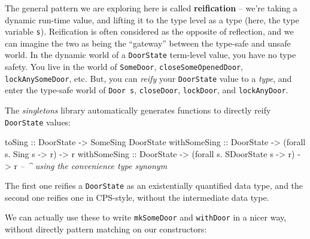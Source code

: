 \documentclass[]{article}
\newenvironment{Shaded}{}{}
\newcommand{\CommentTok}[1]{\textcolor[rgb]{0.38,0.63,0.69}{\textit{#1}}}
\newcommand{\DataTypeTok}[1]{\textcolor[rgb]{0.56,0.13,0.00}{#1}}
\newcommand{\FunctionTok}[1]{\textcolor[rgb]{0.02,0.16,0.49}{#1}}
\newcommand{\NormalTok}[1]{#1}
\newcommand{\OtherTok}[1]{\textcolor[rgb]{0.00,0.44,0.13}{#1}}
\begin{document}
The general pattern we are exploring here is called \textbf{reification} --
we're taking a dynamic run-time value, and lifting it to the type level as a
type (here, the type variable \texttt{s}). Reification is often considered as
the opposite of reflection, and we can imagine the two as being the ``gateway''
between the type-safe and unsafe world. In the dynamic world of a
\texttt{DoorState} term-level value, you have no type safety. You live in the
world of \texttt{SomeDoor}, \texttt{closeSomeOpenedDoor},
\texttt{lockAnySomeDoor}, etc. But, you can \emph{reify} your \texttt{DoorState}
value to a \emph{type}, and enter the type-safe world of \texttt{Door\ s},
\texttt{closeDoor}, \texttt{lockDoor}, and \texttt{lockAnyDoor}.

The \emph{singletons} library automatically generates functions to directly
reify \texttt{DoorState} values:

\begin{Shaded}
\begin{Highlighting}[]
\OtherTok{toSing       ::} \DataTypeTok{DoorState} \OtherTok{->} \DataTypeTok{SomeSing} \DataTypeTok{DoorState}
\OtherTok{withSomeSing ::} \DataTypeTok{DoorState} \OtherTok{->}\NormalTok{ (forall s}\FunctionTok{.} \DataTypeTok{Sing}\NormalTok{ s        }\OtherTok{->}\NormalTok{ r) }\OtherTok{->}\NormalTok{ r}
\OtherTok{withSomeSing ::} \DataTypeTok{DoorState} \OtherTok{->}\NormalTok{ (forall s}\FunctionTok{.} \DataTypeTok{SDoorState}\NormalTok{ s  }\OtherTok{->}\NormalTok{ r) }\OtherTok{->}\NormalTok{ r}
                                     \CommentTok{-- ^ using the convenience type synonym}
\end{Highlighting}
\end{Shaded}

The first one reifies a \texttt{DoorState} as an existentially quantified data
type, and the second one reifies one in CPS-style, without the intermediate data
type.

We can actually use these to write \texttt{mkSomeDoor} and \texttt{withDoor} in
a nicer way, without directly pattern matching on our constructors:
\end{document}
